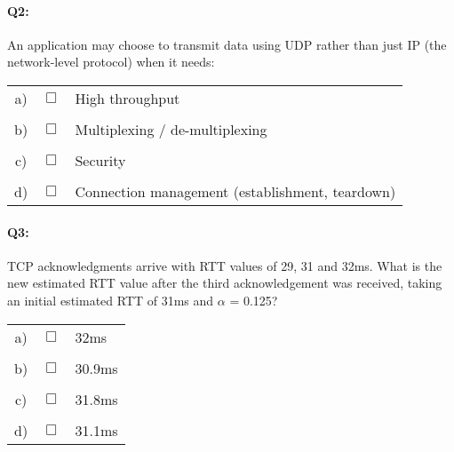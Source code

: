 \documentclass{llncs}
\newcommand{\answer}[1]{}%
\begin{document}
\answer{None of these services are provided by UDP. See slide 16.}

\paragraph{\textbf{Q2:}}
An application may choose to transmit data using UDP rather than just IP (the network-level protocol) when it needs:

\begin{tabular}{ccl}
  a) & $\Box$ &  High throughput\\
  \\
  b) & $\Box$ &  Multiplexing / de-multiplexing\\
  \\
  c) & $\Box$ &  Security\\
  \\
  d) & $\Box$ &  Connection management (establishment, teardown)
\end{tabular}

\answer{Multiplexing and de-multiplexing of datagrams through sockets
  is the main service provided by UDP, through port numbers. UDP
  doesn't provide security or connection management. UDP would provide
  a high throughput \emph{compared to TCP} but not compared to only IP.}

\paragraph{\textbf{Q3:}}
TCP acknowledgments arrive with RTT values of 29, 31 and 32ms. What is the new
estimated RTT value after the third acknowledgement was received, taking an
initial estimated RTT of 31ms and $\alpha$ = 0.125?

\begin{tabular}{ccl}
  a) & $\Box$ &  32ms\\
  \\
  b) & $\Box$ &  30.9ms\\
  \\
  c) & $\Box$ &  31.8ms\\
  \\
  d) & $\Box$ &  31.1ms
\end{tabular}

\answer{See slide 62 in Chapter 3.
  $\mathrm{EstimatedRTT} = (1-\alpha)\mathrm{EstimatedRTT} + \alpha\mathrm{SampleRTT}$.
  \begin{itemize}
  \item Before the first ACK is received: $\mathrm{EstimatedRTT}$=31ms.
  \item After the first ACK is received: $\mathrm{EstimatedRTT}$=(1-0.125)*31+0.125*29=30.75ms
  \item After the second ACK is received: $\mathrm{EstimatedRTT}$=(1-0.125)*30.75+0.125*31=30.78ms
  \item After the third ACK is received: $\mathrm{EstimatedRTT}$=(1-0.125)*30.78+0.125*32=30.93ms
  \end{itemize}
}
\end{document}

